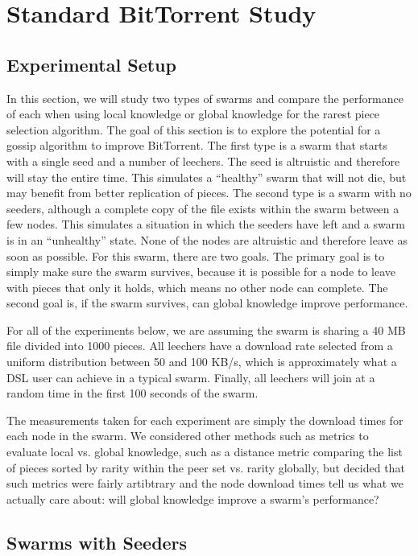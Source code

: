 \section{Standard BitTorrent Study}

\subsection{Experimental Setup}

In this section, we will study two types of swarms and compare the
performance of each when using local knowledge or global knowledge for
the rarest piece selection algorithm. The goal of this section is to
explore the potential for a gossip algorithm to improve BitTorrent.
The first type is a swarm that starts with a single seed and a number
of leechers.  The seed is altruistic and therefore will stay the entire
time. This simulates a ``healthy'' swarm that will not die, but may benefit
from better replication of pieces. The second type is a swarm with no
seeders, although a complete copy of the file exists within the swarm
between a few nodes. This simulates a situation in which the seeders
have left and a swarm is in an ``unhealthy'' state. None of the nodes
are altruistic and therefore leave as soon as possible. For this swarm,
there are two goals. The primary goal is to simply make sure the swarm
survives, because it is possible for a node to leave with pieces that
only it holds, which means no other node can complete. The second goal
is, if the swarm survives, can global knowledge improve performance.

For all of the experiments below, we are assuming the swarm is sharing a
40 MB file divided into 1000 pieces. All leechers have a download rate
selected from a uniform distribution between 50 and 100 KB/s, which is
approximately what a DSL user can achieve in a typical swarm. Finally, all
leechers will join at a random time in the first 100 seconds of the swarm.

The measurements taken for each experiment are simply the download times for
each node in the swarm. We considered other methods such as metrics to
evaluate local vs. global knowledge, such as a distance metric comparing the 
list of pieces sorted by rarity within the peer set vs. rarity globally, but
decided that such metrics were fairly artibtrary and the node download times
tell us what we actually care about: will global knowledge improve a swarm's
performance?

\subsection{Swarms with Seeders}

